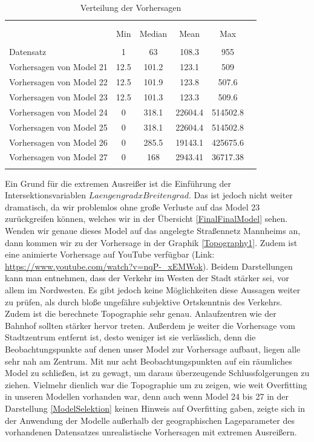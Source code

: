 \documentclass[a4paper,12pt]{thesis}
\begin{document}
\begin{table}[!htbp] \centering 
	\caption{Verteilung der Vorhersagen} 
	\label{ForecastDistribution} 
	\begin{tabular}{@{\extracolsep{-5pt}}lccccc} 
		\\[-1.8ex]\hline 
		\hline \\[-1.8ex] 
		\\[-1.8ex] & Min & Median & Mean & Max\\ 
		\hline \\[-1.8ex] 
		Datensatz & 1 & 63 & 108.3 & 955 \\ 
		Vorhersagen von Model 21	 & 12.5 & 101.2 & 123.1 & 509 \\ 
		Vorhersagen von Model 22	 & 12.5 & 101.9 & 123.8 & 507.6 \\ 
		Vorhersagen von Model 23	 & 12.5 & 101.3 & 123.3 & 509.6 \\ 
		Vorhersagen von Model 24	 & 0 & 318.1 & 22604.4 & 514502.8\\ 
		Vorhersagen von Model 25	 & 0 & 318.1 & 22604.4 & 514502.8\\ 
		Vorhersagen von Model 26	 & 0 & 285.5 & 19143.1 & 425675.6\\ 
		Vorhersagen von Model 27	 & 0 & 168 & 2943.41 & 36717.38\\ 
		\hline \\[-1.8ex] 
	\end{tabular} 
\end{table} 

Ein Grund für die extremen Ausreißer ist die Einführung der Intersektionsvariablen $LaengengradxBreitengrad$. Das ist jedoch nicht weiter dramatisch, da wir problemlos ohne große Verluste auf das Model 23 zurückgreifen können, welches wir in der Übersicht \ref{FinalFinalModel} sehen. Wenden wir genaue dieses Model auf das angelegte Straßennetz Mannheims an, dann kommen wir zu der Vorhersage in der Graphik \ref{Topography1}. Zudem ist eine animierte Vorhersage auf YouTube verfügbar (Link: \url{https://www.youtube.com/watch?v=nqP-_xEMWok}). Beidem Darstellungen kann man entnehmen, dass der Verkehr im Westen der Stadt stärker sei, vor allem im Nordwesten. Es gibt jedoch keine Möglichkeiten diese Aussagen weiter zu prüfen, als durch bloße ungefähre subjektive Ortskenntnis des Verkehrs.\\
Zudem ist die berechnete Topographie sehr genau. Anlaufzentren wie der Bahnhof sollten stärker hervor treten. Außerdem je weiter die Vorhersage vom Stadtzentrum entfernt ist, desto weniger ist sie verlässlich, denn die Beobachtungspunkte auf denen unser Model zur Vorhersage aufbaut, liegen alle sehr nah am Zentrum. Mit nur acht Beobachtungspunkten auf ein räumliches Model zu schließen, ist zu gewagt, um daraus überzeugende Schlussfolgerungen zu ziehen. Vielmehr dienlich war die Topographie um zu zeigen, wie weit Overfitting in unseren Modellen vorhanden war, denn auch wenn Model 24 bis 27 in der Darstellung \ref{ModelSelektion} keinen Hinweis auf Overfitting gaben, zeigte sich in der Anwendung der Modelle außerhalb der geographischen Lageparameter des vorhandenen Datensatzes unrealistische Vorhersagen mit extremen Ausreißern.
\end{document}
